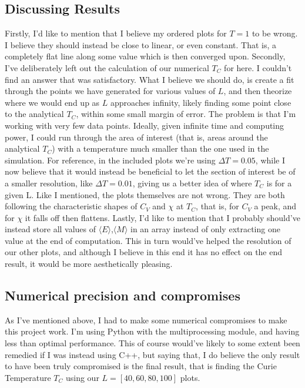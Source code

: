 \documentclass{article}
\begin{document}
\subsection*{Discussing Results}
Firstly, I'd like to mention that I believe my ordered plots for $T = 1$ to be wrong. I believe they should instead be close to linear, or even constant. That is, a completely flat line along some value which is then converged upon.
\newline
Secondly, I've deliberately left out the calculation of our numerical $T_C$ for here. I couldn't find an answer that was satisfactory. What I believe we should do, is create a fit through the points we have generated for various values of $L$, and then theorize where we would end up as $L$ approaches infinity, likely finding some point close to the analytical $T_C$, within some small margin of error.
\newline
The problem is that I'm working with very few data points. Ideally, given infinite time and computing power, I could run through the area of interest (that is, areas around the analytical $T_C$) with a temperature much smaller than the one used in the simulation. For reference, in the included plots we're using $\Delta T = 0.05$, while I now believe that it would instead be beneficial to let the section of interest be of a smaller resolution, like $\Delta T = 0.01$, giving us a better idea of where $T_C$ is for a given L. \newline
Like I mentioned, the plots themselves are not wrong. They are both following the characteristic shapes of $C_V$ and $\chi$ at $T_C$, that is, for $C_V$ a peak, and for $\chi$ it falls off then flattens.
\newline
Lastly, I'd like to mention that I probably should've instead store all values of $\langle E \rangle $,$\langle M \rangle $ in an array instead of only extracting one value at the end of computation. This in turn would've helped the resolution of our other plots, and although I believe in this end it has no effect on the end result, it would be more aesthetically pleasing.
\subsection*{Numerical precision and compromises}
As I've mentioned above, I had to make some numerical compromises to make this project work. I'm using Python with the multiprocessing module, and having less than optimal performance. This of course would've likely to some extent been remedied if I was instead using C++, but saying that, I do believe the only result to have been truly compromised is the final result, that is finding the Curie Temperature $T_C$ using our $L = [40, 60, 80, 100]$ plots. \newpage
\end{document}
